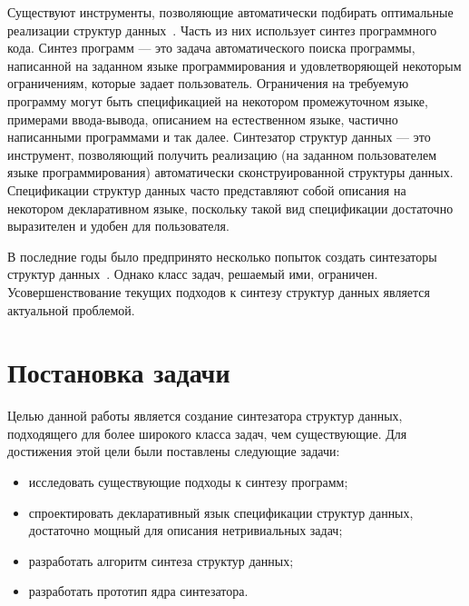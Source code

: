 \documentclass[14pt]{matmex-diploma-custom}
\begin{document}
Существуют инструменты, позволяющие автоматически подбирать оптимальные реализации структур данных~\cite{RelC, Lambda2, Cozy}. Часть из них использует синтез программного кода. Синтез программ --- это задача автоматического поиска программы, написанной на заданном языке программирования и удовлетворяющей некоторым ограничениям, которые задает пользователь. Ограничения на требуемую программу могут быть спецификацией на некотором промежуточном языке, примерами ввода-вывода, описанием на естественном языке, частично написанными программами и так далее. Синтезатор структур данных --- это инструмент, позволяющий получить реализацию (на заданном пользователем языке программирования) автоматически сконструированной структуры данных. Спецификации структур данных часто представляют собой описания на некотором декларативном языке, поскольку такой вид спецификации достаточно выразителен и удобен для пользователя.

В последние годы было предпринято несколько попыток создать синтезаторы структур данных~\cite{Cozy}. Однако класс задач, решаемый ими, ограничен.
Усовершенствование текущих подходов к синтезу структур данных является актуальной проблемой.



\section{Постановка задачи}
Целью данной работы является создание синтезатора структур данных, подходящего для более широкого класса задач, чем существующие. Для достижения этой цели были поставлены следующие задачи:
\begin{itemize}
    \item исследовать существующие подходы к синтезу программ;
    \item спроектировать декларативный язык спецификации структур данных, достаточно мощный для описания нетривиальных задач;
    \item разработать алгоритм синтеза структур данных;
    \item разработать прототип ядра синтезатора.
\end{itemize}
\end{document}
